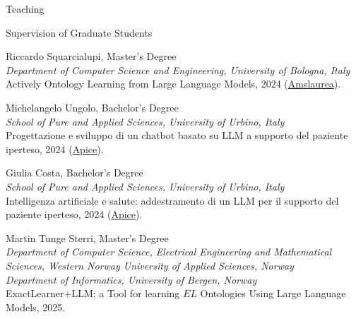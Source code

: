 \documentclass{resume} %
\begin{document}
\begin{rSection}{Teaching}
\begin{rSubsection2}{Supervision of Graduate Students}
            \item Riccardo Squarcialupi, Master's Degree
            \\ \emph{\small{Department of Computer Science and Engineering, University of Bologna, Italy}}
            \\ Actively Ontology Learning from Large Language Models, 2024 (\href{https://amslaurea.unibo.it/id/eprint/32247/}{Amslaurea}).
            \item Michelangelo Ungolo, Bachelor's Degree
            \\ \emph{\small{School of Pure and Applied Sciences, University of Urbino, Italy}}
            \\ Progettazione e sviluppo di un chatbot basato su LLM a supporto del paziente iperteso, 2024 (\href{https://apice.unibo.it/xwiki/bin/view/Thesis/ChatbotLLMIpertensioneUngolo2024}{Apice}).
            \item Giulia Costa, Bachelor's Degree
            \\ \emph{\small{School of Pure and Applied Sciences, University of Urbino, Italy}}
            \\ Intelligenza artificiale e salute: addestramento di un LLM per il supporto del paziente iperteso, 2024 (\href{https://apice.unibo.it/xwiki/bin/view/Thesis/AddestramentoLLMPerPazienteIpertesoCosta2024}{Apice}).
            \item Martin Tunge Sterri, Master's Degree
            \\\emph{\small{Department of Computer Science, Electrical Engineering and Mathematical Sciences, Western Norway University of Applied Sciences, Norway}}
            \\\emph{\small{Department of Informatics, University of Bergen, Norway}}
            \\ExactLearner+LLM: a Tool for learning $EL$ Ontologies Using Large Language Models, 2025.

        \end{rSubsection2}

    \end{rSection}


\end{document}
